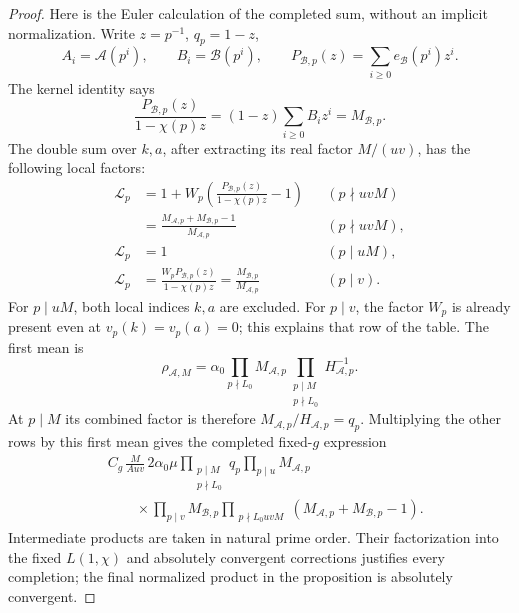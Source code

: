 \begin{proof}
Here is the Euler calculation of the completed sum, without an
implicit normalization.  Write \(z=p^{-1}\), \(q_p=1-z\),
\[
 A_i=\mathcal A(p^i),\qquad B_i=\mathcal B(p^i),\qquad
 P_{\mathcal B,p}(z)=\sum_{i\ge0}e_{\mathcal B}(p^i)z^i.
\]
The kernel identity says
\[
 \frac{P_{\mathcal B,p}(z)}{1-\chi(p)z}
                    =(1-z)\sum_{i\ge0}B_i z^i
                    =M_{\mathcal B,p}.
\]
The double sum over \(k,a\), after extracting its real factor
\(M/(uv)\), has the following local factors:
\begin{align*}
 \mathcal L_p
 &=1+W_p\left(\frac{P_{\mathcal B,p}(z)}{1-\chi(p)z}-1\right)
       &&(p\nmid uvM)\\
 &=\frac{M_{\mathcal A,p}+M_{\mathcal B,p}-1}
                      {M_{\mathcal A,p}}
       &&(p\nmid uvM),\\
 \mathcal L_p&=1 &&(p\mid uM),\\
 \mathcal L_p
 &=\frac{W_pP_{\mathcal B,p}(z)}{1-\chi(p)z}
       =\frac{M_{\mathcal B,p}}{M_{\mathcal A,p}}
       &&(p\mid v).
\end{align*}
For \(p\mid uM\), both local indices \(k,a\) are excluded.
For \(p\mid v\), the factor \(W_p\) is already present even at
\(v_p(k)=v_p(a)=0\); this explains that row of the table.
The first mean is
\[
 \rho_{\mathcal A,M}
 =\alpha_0\prod_{p\nmid L_0}M_{\mathcal A,p}
          \prod_{\substack{p\mid M\\p\nmid L_0}}H_{\mathcal A,p}^{-1}.
\]
At \(p\mid M\) its combined factor is therefore
\(M_{\mathcal A,p}/H_{\mathcal A,p}=q_p\).
Multiplying the other rows by this first mean gives the completed
fixed-\(g\) expression
\begin{equation}\label{eq:older-completed-g}
 \begin{aligned}
 &C_g\,\frac{M}{Auv}\,2\alpha_0\mu
 \prod_{\substack{p\mid M\\p\nmid L_0}}q_p
 \prod_{p\mid u}M_{\mathcal A,p}\\
 &\qquad{}\times
 \prod_{p\mid v}M_{\mathcal B,p}
 \prod_{\substack{p\nmid L_0uvM}}
                (M_{\mathcal A,p}+M_{\mathcal B,p}-1).
 \end{aligned}
\end{equation}
Intermediate products are taken in natural prime order.
Their factorization into the fixed \(L(1,\chi)\) and absolutely
convergent corrections justifies every completion; the final
normalized product in the proposition is absolutely convergent.


\end{proof}
